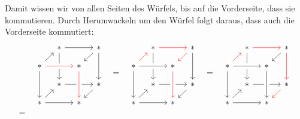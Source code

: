 \documentclass[a4paper,10pt]{article}
\begin{document}
Damit wissen wir von allen Seiten des Würfels, bis auf die Vorderseite, dass sie kommutieren.
Durch Herumwackeln um den Würfel folgt daraus, dass auch die Vorderseite kommutiert:
\[
  \begin{array}{cccccccc}
        &
    \begin{tikzcd}[row sep = 10, column sep = 10]
        {}
      & *
        \arrow[rr]
        \arrow[dd]
      & {}
      & *
        \arrow[dl]
        \arrow[dd]
      \\
        *
        \arrow[ur]
        \arrow[rr, crossing over, red]
        \arrow[dd]
      & {}
      & *
      & {}
      \\
        {}
      & *
        \arrow[rr]
      & {}
      & *
        \arrow[dl]
      \\
        *
        \arrow[ur]
        \arrow[rr]
      & {}
      & *
        \arrow[from=uu, crossing over, red]
      & {}
    \end{tikzcd}
    & = &
   \begin{tikzcd}[row sep = 10, column sep = 10]
        {}
      & *
        \arrow[rr, red]
        \arrow[dd]
      & {}
      & *
        \arrow[dl, red]
        \arrow[dd]
      \\
        *
        \arrow[ur, red]
        \arrow[rr, crossing over]
        \arrow[dd]
      & {}
      & *
      & {}
      \\
        {}
      & *
        \arrow[rr]
      & {}
      & *
        \arrow[dl]
      \\
        *
        \arrow[ur]
        \arrow[rr]
      & {}
      & *
        \arrow[from=uu, crossing over, red]
      & {}
    \end{tikzcd}
    & = &
    \begin{tikzcd}[row sep = 10, column sep = 10]
        {}
      & *
        \arrow[rr, red]
        \arrow[dd]
      & {}
      & *
        \arrow[dl]
        \arrow[dd, red]
      \\
        *
        \arrow[ur, red]
        \arrow[rr, crossing over]
        \arrow[dd]
      & {}
      & *
      & {}
      \\
        {}
      & *
        \arrow[rr]
      & {}
      & *
        \arrow[dl, red]
      \\
        *
        \arrow[ur]
        \arrow[rr]
      & {}
      & *
        \arrow[from=uu, crossing over]
      & {}
    \end{tikzcd}
    \\
      = &
    \begin{tikzcd}[row sep = 10, column sep = 10]

\end{tikzcd}
\end{array}\]
\end{document}
